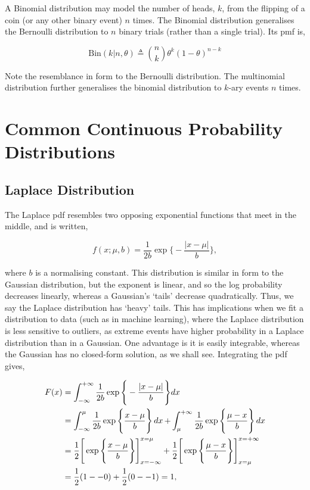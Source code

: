 \documentclass[11pt]{amsart}
\begin{document}
A Binomial distribution may model the number of heads, $k$, from the flipping of a coin (or any other binary event) $n$ times. The Binomial distribution generalises the Bernoulli distribution to $n$ binary trials (rather than a single trial). Its pmf is,

$$\text{Bin}(k | n,\theta) \triangleq {{n}\choose{k}}\theta^{k}(1 - \theta)^{n-k}$$

Note the resemblance in form to the Bernoulli distribution. The multinomial distribution further generalises the binomial distribution to $k$-ary events $n$ times.

\section{Common Continuous Probability Distributions}

\subsection{Laplace Distribution}

The Laplace pdf resembles two opposing exponential functions that meet in the middle, and is written,

$$f(x ; \mu, b) = \frac{1}{2b}\exp\Bigg\{-\frac{|x - \mu|}{b}\Bigg\},$$

where $b$ is a normalising constant. This distribution is similar in form to the Gaussian distribution, but the exponent is linear, and so the log probability decreases linearly, whereas a Gaussian's `tails' decrease quadratically. Thus, we say the Laplace distribution has `heavy' tails. This has implications when we fit a distribution to data (such as in machine learning), where the Laplace distribution is less sensitive to outliers, as extreme events have higher probability in a Laplace distribution than in a Gaussian. One advantage is it is easily integrable, whereas the Gaussian has no closed-form solution, as we shall see. Integrating the pdf gives,

\begin{align}
F(x) &= \int_{-\infty}^{+\infty} \frac{1}{2b}\exp\Bigg\{-\frac{|x - \mu|}{b}\Bigg\}dx \notag \\
&= \int_{-\infty}^{\mu} \frac{1}{2b}\exp\Bigg\{\frac{x - \mu}{b}\Bigg\}\mathop{dx} + \int_{\mu}^{+\infty} \frac{1}{2b}\exp\Bigg\{\frac{\mu - x}{b}\Bigg\}\mathop{dx} \notag \\
&= \frac{1}{2}\Bigg[\exp\Bigg\{\frac{x - \mu}{b}\Bigg\}\Bigg]_{x=-\infty}^{x=\mu} + \frac{1}{2}\Bigg[\exp\Bigg\{\frac{\mu - x}{b}\Bigg\}\Bigg]_{x=\mu}^{x=+\infty} \notag \\
&= \frac{1}{2}(1 - -0) + \frac{1}{2}(0 - -1) \notag
= 1, \notag
\end{align}
\end{document}
